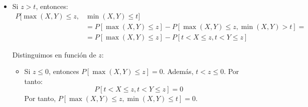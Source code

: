 \begin{ejercicio}
\begin{enumerate}
\begin{itemize}
            \item Si $z>t$, entonces:
            \begin{align*}
                P[\max(X,Y)\leq z,&\min(X,Y)\leq t]
                \\&=P[\max(X,Y)\leq z]-P[\max(X,Y)\leq z,\min(X,Y)> t]
                =\\&= P[\max(X,Y)\leq z]-P[t<X\leq z,t<Y\leq z]
            \end{align*}

            Distinguimos en función de $z$:
            \begin{itemize}
                \item Si $z\leq 0$, entonces $P[\max(X,Y)\leq z]=0$. Además, $t<z\leq 0$. Por tanto:
                \begin{equation*}
                    P[t<X\leq z,t<Y\leq z]=0
                \end{equation*}
                Por tanto, $P[\max(X,Y)\leq z,\min(X,Y)\leq t]=0$.


\end{itemize}
\end{itemize}
\end{enumerate}
\end{ejercicio}
